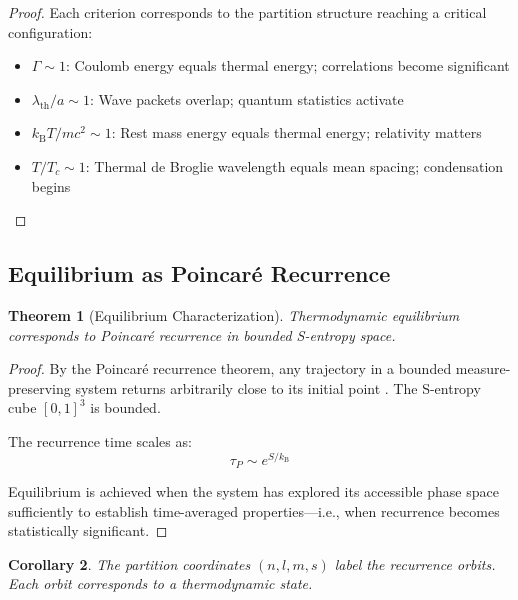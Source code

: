 \documentclass[twocolumn,10pt,a4paper]{article}
\newtheorem{theorem}{Theorem}[section]
\newtheorem{corollary}[theorem]{Corollary}
\theoremstyle{definition}
\theoremstyle{remark}
\newcommand{\kB}{k_{\mathrm{B}}}
\begin{document}
\begin{proof}
Each criterion corresponds to the partition structure reaching a critical configuration:
\begin{itemize}
    \item $\Gamma \sim 1$: Coulomb energy equals thermal energy; correlations become significant
    \item $\lambda_{\text{th}}/a \sim 1$: Wave packets overlap; quantum statistics activate
    \item $\kB T/mc^2 \sim 1$: Rest mass energy equals thermal energy; relativity matters
    \item $T/T_c \sim 1$: Thermal de Broglie wavelength equals mean spacing; condensation begins
\end{itemize}
\end{proof}

\subsection{Equilibrium as Poincar\'{e} Recurrence}

\begin{theorem}[Equilibrium Characterization]
Thermodynamic equilibrium corresponds to Poincar\'{e} recurrence \cite{poincare1890} in bounded S-entropy space.
\end{theorem}

\begin{proof}
By the Poincar\'{e} recurrence theorem, any trajectory in a bounded measure-preserving system returns arbitrarily close to its initial point \cite{cornfeld1982}. The S-entropy cube $[0,1]^3$ is bounded.

The recurrence time scales as:
\begin{equation}
    \tau_P \sim e^{S/\kB}
\end{equation}

Equilibrium is achieved when the system has explored its accessible phase space sufficiently to establish time-averaged properties---i.e., when recurrence becomes statistically significant.
\end{proof}

\begin{corollary}
The partition coordinates $(n, l, m, s)$ label the recurrence orbits. Each orbit corresponds to a thermodynamic state.
\end{corollary}
\end{document}
